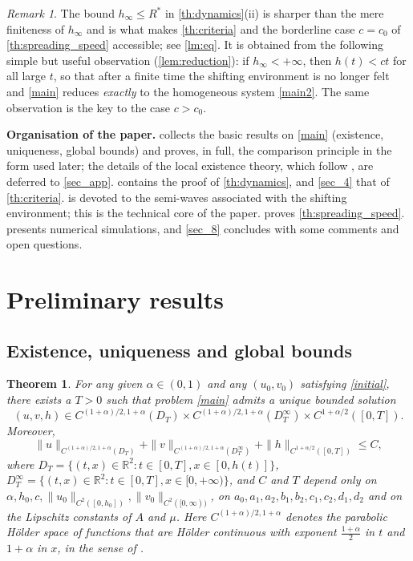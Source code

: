 \documentclass[reqno]{amsart}
\theoremstyle{plain}
\newtheorem{theorem}{Theorem}
\theoremstyle{definition}
\theoremstyle{remark}
\newtheorem{remark}{Remark}
\begin{document}
\begin{remark}\label{rm:hinfty}
	The bound $h_\infty\le R^*$ in \cref{th:dynamics}(ii) is sharper than the mere
	finiteness of $h_\infty$ and is what makes \cref{th:criteria} and the
	borderline case $c=c_0$ of \cref{th:spreading_speed} accessible; see
	\cref{lm:eq}. It is obtained from the following simple but useful observation
	(\cref{lem:reduction}): if $h_\infty<+\infty$, then $h(t)<ct$ for all large
	$t$, so that after a finite time the shifting environment is no longer felt
	and \eqref{main} reduces \emph{exactly} to the homogeneous system
	\eqref{main2}. The same observation is the key to the case $c>c_0$.
\end{remark}

\textbf{Organisation of the paper.}  collects the basic results on
\eqref{main} (existence, uniqueness, global bounds) and proves, in full, the
comparison principle in the form used later; the details of the local existence
theory, which follow \cite[Theorem 2.1]{MR3327894}, are deferred to
\cref{sec_app}.  contains the proof
of \cref{th:dynamics}, and \cref{sec_4} that of \cref{th:criteria}. 
is devoted to the semi-waves associated with the shifting environment; this is
the technical core of the paper.  proves \cref{th:spreading_speed}.
 presents numerical simulations, and \cref{sec_8} concludes with some
comments and open questions.

\section{Preliminary results}\label{sec_2}

\subsection{Existence, uniqueness and global bounds}

\begin{theorem}\label{th4}
	For any given $\alpha \in (0, 1)$ and any $(u_0, v_0)$ satisfying
	\eqref{initial}, there exists a $T > 0$ such that problem \eqref{main} admits
	a unique bounded solution
	$$
	(u, v, h) \in C^{(1+\alpha)/2, 1 + \alpha}(D_T) \times C^{(1+\alpha)/2, 1 + \alpha}(D_T^{\infty}) \times C^{1 + \alpha/2}([0,T]).
	$$
	Moreover,
	$$
	\|u\|_{C^{(1+\alpha)/2, 1 + \alpha}(D_T)} + \|v\|_{C^{(1+\alpha)/2, 1 + \alpha}(D_T^{\infty})} + \|h\|_{C^{1 + \alpha/2}([0,T])} \leq C,
	$$
	where $D_T = \{(t,x) \in \mathbb{R}^2: t \in [0,T], x \in [0, h(t)]\}$,
	$D_T^{\infty} = \{(t,x)\in \mathbb{R}^2: t \in [0,T], x \in [0, +\infty)\}$, and $C$
	and $T$ depend only on $\alpha, h_0, c, \|u_0\|_{C^2([0,h_0])},
	\|v_0\|_{C^2([0,\infty))}$, on $a_0,a_1,a_2,b_1,b_2,c_1,c_2,d_1,d_2$ and on
	the Lipschitz constants of $A$ and $\mu$. Here $C^{(1+\alpha)/2,1+\alpha}$
	denotes the parabolic H\"older space of functions that are H\"older continuous
	with exponent $\frac{1+\alpha}{2}$ in $t$ and $1+\alpha$ in $x$, in the sense
	of \cite[Chapter IV]{MR241821}.
\end{theorem}
\end{document}
